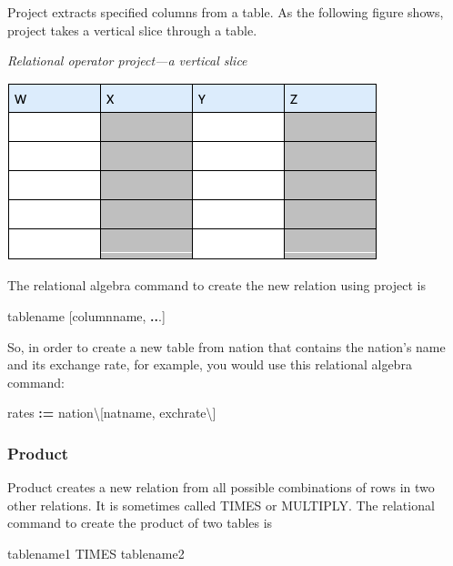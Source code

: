\documentclass[
]{article}
\newenvironment{Shaded}{\begin{snugshade}}{\end{snugshade}}
\newcommand{\NormalTok}[1]{#1}
\newcommand{\OperatorTok}[1]{\textcolor[rgb]{0.81,0.36,0.00}{\textbf{#1}}}
\begin{document}
Project extracts specified columns from a table. As the following figure
shows, project takes a vertical slice through a table.

\emph{Relational operator project---a vertical slice}

\includegraphics{Figures/Chapter 9/shadowed-columns.png}

The relational algebra command to create the new relation using project
is

\begin{Shaded}
\begin{Highlighting}[]
\NormalTok{tablename [columnname, }\OperatorTok{..}\NormalTok{.]}
\end{Highlighting}
\end{Shaded}

So, in order to create a new table from nation that contains the
nation's name and its exchange rate, for example, you would use this
relational algebra command:

\begin{Shaded}
\begin{Highlighting}[]
\NormalTok{rates }\OperatorTok{:=}\NormalTok{ nation\textbackslash{}[natname, exchrate\textbackslash{}]}
\end{Highlighting}
\end{Shaded}

\hypertarget{product}{%
\subsubsection*{Product}\label{product}}

Product creates a new relation from all possible combinations of rows in
two other relations. It is sometimes called TIMES or MULTIPLY. The
relational command to create the product of two tables is

\begin{Shaded}
\begin{Highlighting}[]
\NormalTok{tablename1 TIMES tablename2}
\end{Highlighting}
\end{Shaded}
\end{document}
